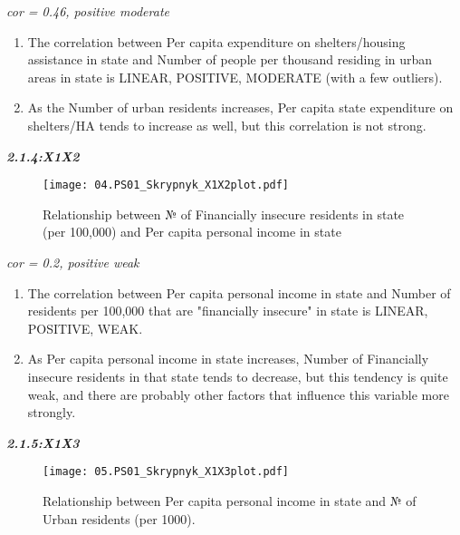 \documentclass[12pt,letterpaper]{article}
\begin{document}
	\noindent 
\centering
\textit{cor = 0.46, positive moderate} 

\begin{enumerate}[$\circ$]
	\item The correlation between Per capita expenditure on shelters/housing assistance in state and Number of people per thousand residing in urban areas in state is LINEAR, POSITIVE, MODERATE (with a few outliers). 
	\item As the Number of urban residents increases, Per capita state expenditure on shelters/HA tends to increase as well, but this correlation is not strong.
	\vspace{5cm}
\end{enumerate}

\noindent \begin{center}
	\textbf {\textit{2.1.4:X1X2}}
\end{center}

\begin{figure}[H]
	\centering
	\caption{\footnotesize Relationship between № of Financially insecure residents in state (per 100,000) and Per capita personal income in state}
	\label{fig:plot_4}
	\texttt{[image: 04.PS01\_Skrypnyk\_X1X2plot.pdf]}
\end{figure}

\noindent 
\centering
\textit{cor = 0.2, positive weak} 

\begin{enumerate}[$\circ$]
	\item The correlation between Per capita personal income in state and Number of residents per 100,000 that are "financially insecure" in state is LINEAR, POSITIVE, WEAK.
	\item As Per capita personal income in state increases, Number of Financially insecure residents in that state tends to decrease, but this tendency is quite weak, and there are probably other factors that influence this variable more strongly. 
	\vspace{5cm}
	
\end{enumerate}

\noindent \begin{center}
	\textbf {\textit{2.1.5:X1X3}}
\end{center}

\begin{figure}[H]
	\centering
	\caption{\footnotesize Relationship between Per capita personal income in state and № of Urban residents (per 1000).}
	\label{fig:plot_5}
	\texttt{[image: 05.PS01\_Skrypnyk\_X1X3plot.pdf]}
\end{figure}
\end{document}
